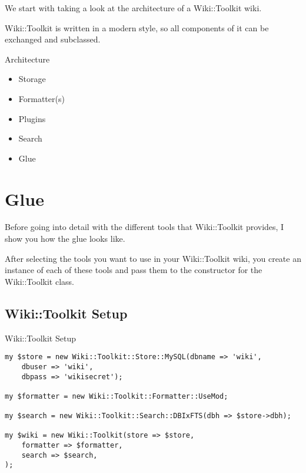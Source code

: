 
We start with taking a look at the architecture of a Wiki::Toolkit wiki.

Wiki::Toolkit is written in a modern style, so all components of
it can be exchanged and subclassed.

\begin{frame}{Architecture}
 \begin{itemize}
  \item Storage
  \item Formatter(s)
  \item Plugins
  \item Search
  \item Glue
 \end{itemize}
\end{frame}


\section{Glue}

Before going into detail with the different tools that Wiki::Toolkit
provides, I show you how the glue looks like.

After selecting the tools you want to use in your Wiki::Toolkit wiki,
you create an instance of each of these tools and pass them to
the constructor for the Wiki::Toolkit class.

\subsection{Wiki::Toolkit Setup}

\begin{frame}[fragile]{Wiki::Toolkit Setup}
\begin{lstlisting}
my $store = new Wiki::Toolkit::Store::MySQL(dbname => 'wiki',
    dbuser => 'wiki',
    dbpass => 'wikisecret');

my $formatter = new Wiki::Toolkit::Formatter::UseMod;

my $search = new Wiki::Toolkit::Search::DBIxFTS(dbh => $store->dbh);

my $wiki = new Wiki::Toolkit(store => $store,
    formatter => $formatter,
    search => $search,
);
\end{lstlisting}
\end{frame}

